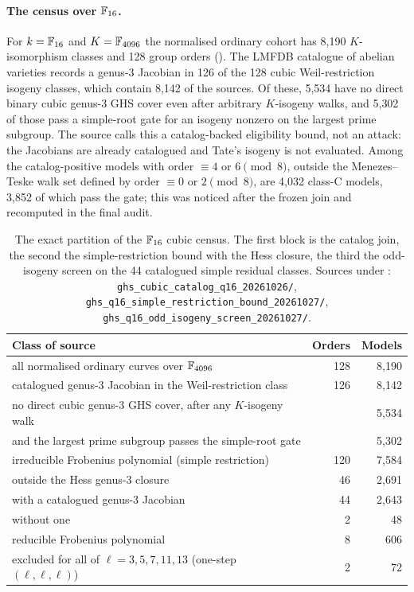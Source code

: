 \paragraph{The census over $\mathbb{F}_{16}$.} For $k=\mathbb{F}_{16}$ and $K=\mathbb{F}_{4096}$
the normalised ordinary cohort has 8{,}190 $K$-isomorphism classes and 128
group orders (). The
LMFDB catalogue of abelian varieties records a genus-3 Jacobian in 126 of
the 128 cubic Weil-restriction isogeny classes, which contain 8{,}142 of
the sources. Of these, 5{,}534 have no direct binary cubic genus-3 GHS cover
even after arbitrary $K$-isogeny walks, and 5{,}302 of those pass a
simple-root gate for an isogeny nonzero on the largest prime subgroup. The
source calls this a catalog-backed eligibility bound, not an attack: the
Jacobians are already catalogued and Tate's isogeny is not evaluated.
Among the catalog-positive models with order $\equiv4$ or $6\pmod8$, outside
the Menezes--Teske walk set defined by order $\equiv0$ or $2\pmod 8$, are
4{,}032 class-C models, 3{,}852 of which pass the gate; this was noticed after
the frozen join and recomputed in the final audit.

\begin{table}[t]
\centering\small
\begin{tabular}{@{}lrr@{}}
\toprule
Class of source & Orders & Models \\
\midrule
all normalised ordinary curves over $\mathbb{F}_{4096}$ & 128 & 8{,}190 \\
catalogued genus-3 Jacobian in the Weil-restriction class & 126 & 8{,}142 \\
\quad no direct cubic genus-3 GHS cover, after any $K$-isogeny walk & & 5{,}534 \\
\quad and the largest prime subgroup passes the simple-root gate & & 5{,}302 \\
\addlinespace
irreducible Frobenius polynomial (simple restriction) & 120 & 7{,}584 \\
\quad outside the Hess genus-3 closure & 46 & 2{,}691 \\
\quad\quad with a catalogued genus-3 Jacobian & 44 & 2{,}643 \\
\quad\quad without one & 2 & 48 \\
reducible Frobenius polynomial & 8 & 606 \\
\addlinespace
excluded for all of $\ell=3,5,7,11,13$ (one-step $(\ell,\ell,\ell)$) & 2 & 72 \\
\bottomrule
\end{tabular}
\caption[]{The exact partition of the $\mathbb{F}_{16}$ cubic census. The first
block is the catalog join, the second the simple-restriction bound with the
Hess closure, the third the odd-isogeny screen on the 44 catalogued simple
residual classes. Sources under :
\texttt{ghs\_cubic\_catalog\_q16\_20261026/},
\texttt{ghs\_q16\_simple\_restriction\_bound\_20261027/},
\texttt{ghs\_q16\_odd\_isogeny\_screen\_20261027/}.}
\label{tab:ghs-partition}
\end{table}

